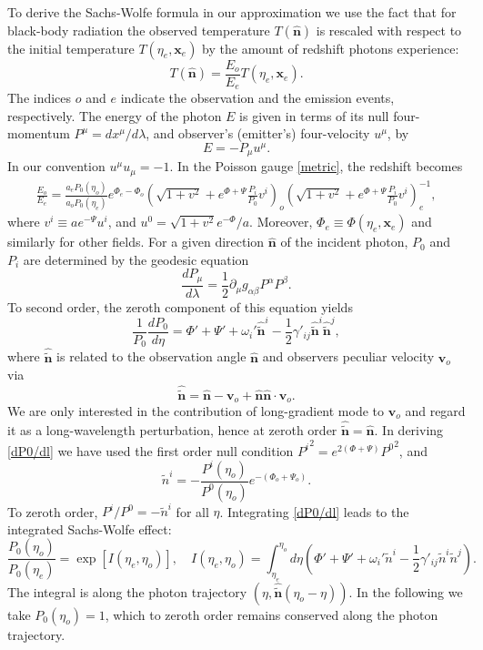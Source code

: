 \documentclass[12pt]{article}
\numberwithin{equation}{section}
\def\bsb{\boldsymbol}
\def\bea{\begin{eqnarray}}
\def\eea{\end{eqnarray}}
\def\be{\begin{equation}}
\def\ee{\end{equation}}
\def\d{\partial}
\def\n{\bsb{\hat n}}
\def\x{{\bsb x}}
\begin{document}
{To derive the Sachs-Wolfe formula in our approximation we use the fact that for black-body radiation the observed temperature $T(\n)$ is rescaled with respect to the initial temperature $T(\eta_e,\x_e)$ by the amount of redshift photons experience:
\be
T(\bsb{\hat n}) = \frac{E_o}{E_e}T(\eta_e,\bsb x_e).
\ee 
The indices $o$ and $e$ indicate the observation and the emission events, respectively. The energy of the photon $E$ is given in terms of its null four-momentum $P^\mu=dx^\mu /d\lambda$, and observer's (emitter's) four-velocity $u^\mu$, by
\be
E=-P_\mu u^\mu.
\ee
In our convention $u^\mu u_\mu =-1$. In the Poisson gauge \eqref{metric}, the redshift becomes
\bea
\label{redshift}
\frac{E_o}{E_e}=\frac{a_e P_0(\eta_o)}{a_o P_0(\eta_e)}e^{\Phi_e - \Phi_o}
\left(\sqrt{1+v^2}+e^{\Phi+\Psi}\frac{P_i}{P_0}v^i\right)_o \left(\sqrt{1+v^2}+e^{\Phi+\Psi}\frac{P_i}{P_0}v^i\right)_e^{-1},
\eea
where $v^i\equiv a e^{-\Psi}u^i$, and $u^0=\sqrt{1+v^2}e^{-\Phi}/a$. Moreover, $\Phi_e \equiv \Phi(\eta_e,\x_e)$ and similarly for other fields. For a given direction $\bsb{\hat n}$ of the incident photon, $P_0$ and $P_i$ are determined by the geodesic equation
\be
\label{geo}
\frac{dP_\mu}{d\lambda}=\frac{1}{2}\d_\mu g_{\alpha\beta}P^\alpha P^\beta.
\ee
To second order, the zeroth component of this equation yields
\be
\label{dP0/dl}
\frac{1}{P_0}\frac{dP_0}{d\eta}=\Phi'+\Psi'+\omega_i'\bsb{\hat{\tilde n}}^i-\frac{1}{2}\gamma'_{ij}\bsb{\hat{\tilde n}}^i\bsb{\hat{\tilde n}}^j,
\ee
where $\bsb{\bsb{\hat{\tilde n}}}$ is related to the observation angle $\bsb{\hat n}$ and observers peculiar velocity $\bsb v_o$ via
\be
\label{tilden}
\bsb{\bsb{\hat{\tilde n}}}=\bsb{\hat n} -\bsb v_o + \bsb{\hat n} \bsb{\hat n}\cdot \bsb v_o.
\ee
We are only interested in the contribution of long-gradient mode to $\bsb v_o$ and regard it as a long-wavelength perturbation, hence at zeroth order $\bsb{\hat{\tilde n}}=\bsb{\hat n}$. In deriving \eqref{dP0/dl} we have used the first order null condition ${P^i}^2 = e^{2(\Phi+\Psi)}{P^0}^2$, and
\be
{{\tilde n}}^i = -\frac{P^i(\eta_o)}{P^0(\eta_o)}e^{-(\Phi_o+\Psi_o)}.
\ee
To zeroth order, $P^i/P^0=-{\tilde n}^i$ for all $\eta$. Integrating \eqref{dP0/dl} leads to the integrated Sachs-Wolfe effect:
\be
\label{I}
\frac{P_0(\eta_o)}{P_0(\eta_e)}=\exp[I(\eta_e,\eta_o)],\quad 
I(\eta_e,\eta_o)=\int_{\eta_e}^{\eta_o} d\eta 
\left(\Phi'+\Psi'+\omega_i'{\tilde n}^i-\frac{1}{2}\gamma'_{ij} {\tilde n}^i {\tilde n}^j\right).
\ee
The integral is along the photon trajectory $(\eta,\bsb{\hat{\tilde n}}(\eta_o -\eta))$. In the following we take $P_0(\eta_o)=1$, which to zeroth order remains conserved along the photon trajectory.

}
\end{document}
